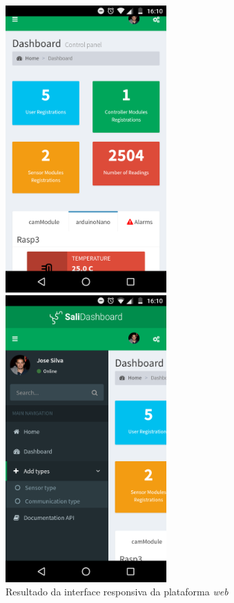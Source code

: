 \begin{figure}[h]
	\centering
	\begin{minipage}[b]{0.495\textwidth}
		\centering
		\includegraphics[width=0.55\textwidth]{img/mobileprint1.png}
	\end{minipage}
	\hfill
	\begin{minipage}[b]{0.495\textwidth}
		\centering
		\includegraphics[width=0.55\textwidth]{img/mobileprint2.png}
	\end{minipage}
	\caption{Resultado da interface responsiva da plataforma \textit{web}}
			\label{responsiveinterface}
\end{figure}



